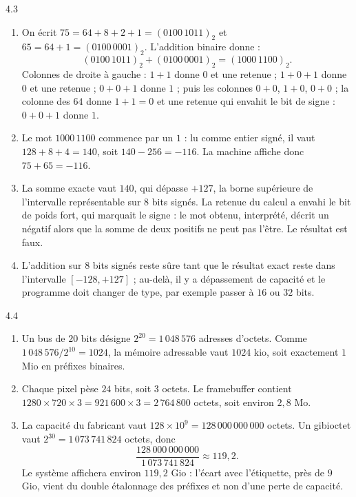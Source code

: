 \begin{corrige}{4.3}
\begin{enumerate}
\item On écrit $75 = 64 + 8 + 2 + 1 = (0100\,1011)_2$ et $65 = 64 + 1 = (0100\,0001)_2$. L'addition binaire donne :
\[
(0100\,1011)_2 + (0100\,0001)_2 = (1000\,1100)_2 .
\]
Colonnes de droite à gauche : $1+1$ donne $0$ et une retenue ; $1+0+1$ donne $0$ et une retenue ; $0+0+1$ donne $1$ ; puis les colonnes $0+0$, $1+0$, $0+0$ ; la colonne des $64$ donne $1+1 = 0$ et une retenue qui envahit le bit de signe : $0+0+1$ donne $1$.
\item Le mot $1000\,1100$ commence par un $1$ : lu comme entier signé, il vaut $128 + 8 + 4 = 140$, soit $140 - 256 = -116$. La machine affiche donc $75 + 65 = -116$.
\item La somme exacte vaut $140$, qui dépasse $+127$, la borne supérieure de l'intervalle représentable sur $8$ bits signés. La retenue du calcul a envahi le bit de poids fort, qui marquait le signe : le mot obtenu, interprété, décrit un négatif alors que la somme de deux positifs ne peut pas l'être. Le résultat est faux.
\item L'addition sur $8$ bits signés reste sûre tant que le résultat exact reste dans l'intervalle $[-128, +127]$ ; au-delà, il y a dépassement de capacité et le programme doit changer de type, par exemple passer à $16$ ou $32$ bits.
\end{enumerate}
\end{corrige}

\begin{corrige}{4.4}
\begin{enumerate}
\item Un bus de $20$ bits désigne $2^{20} = 1\,048\,576$ adresses d'octets. Comme $1\,048\,576 / 2^{10} = 1024$, la mémoire adressable vaut $1024$ kio, soit exactement $1$ Mio en préfixes binaires.
\item Chaque pixel pèse $24$ bits, soit $3$ octets. Le framebuffer contient $1280 \times 720 \times 3 = 921\,600 \times 3 = 2\,764\,800$ octets, soit environ $2{,}8$ Mo.
\item La capacité du fabricant vaut $128 \times 10^9 = 128\,000\,000\,000$ octets. Un gibioctet vaut $2^{30} = 1\,073\,741\,824$ octets, donc
\[
\frac{128\,000\,000\,000}{1\,073\,741\,824} \approx 119{,}2 .
\]
Le système affichera environ $119{,}2$ Gio : l'écart avec l'étiquette, près de $9$ Gio, vient du double étalonnage des préfixes et non d'une perte de capacité.
\end{enumerate}
\end{corrige}
